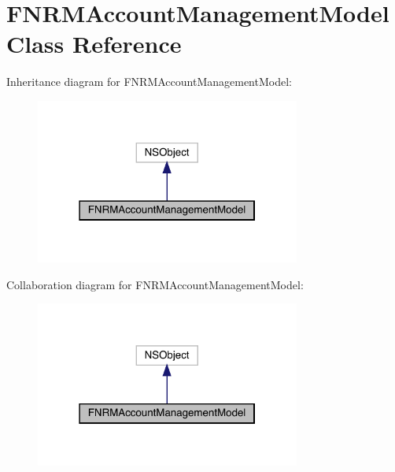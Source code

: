 \hypertarget{interface_f_n_r_m_account_management_model}{}\section{F\+N\+R\+M\+Account\+Management\+Model Class Reference}
\label{interface_f_n_r_m_account_management_model}


Inheritance diagram for F\+N\+R\+M\+Account\+Management\+Model\+:\nopagebreak
\begin{figure}[H]
\begin{center}
\leavevmode
\includegraphics[width=247pt]{interface_f_n_r_m_account_management_model__inherit__graph}
\end{center}
\end{figure}


Collaboration diagram for F\+N\+R\+M\+Account\+Management\+Model\+:\nopagebreak
\begin{figure}[H]
\begin{center}
\leavevmode
\includegraphics[width=247pt]{interface_f_n_r_m_account_management_model__coll__graph}
\end{center}
\end{figure}
